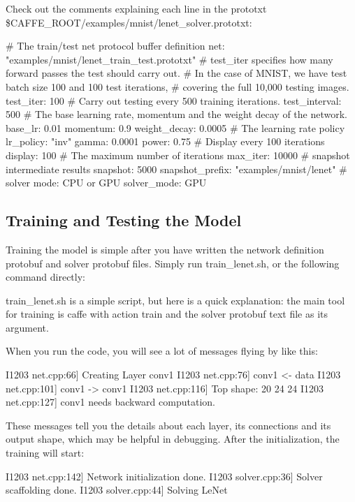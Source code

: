 Check out the comments explaining each line in the prototxt {\ttfamily \$\+C\+A\+F\+F\+E\+\_\+\+R\+O\+OT/examples/mnist/lenet\+\_\+solver.prototxt}\+: \begin{DoxyVerb}# The train/test net protocol buffer definition
net: "examples/mnist/lenet_train_test.prototxt"
# test_iter specifies how many forward passes the test should carry out.
# In the case of MNIST, we have test batch size 100 and 100 test iterations,
# covering the full 10,000 testing images.
test_iter: 100
# Carry out testing every 500 training iterations.
test_interval: 500
# The base learning rate, momentum and the weight decay of the network.
base_lr: 0.01
momentum: 0.9
weight_decay: 0.0005
# The learning rate policy
lr_policy: "inv"
gamma: 0.0001
power: 0.75
# Display every 100 iterations
display: 100
# The maximum number of iterations
max_iter: 10000
# snapshot intermediate results
snapshot: 5000
snapshot_prefix: "examples/mnist/lenet"
# solver mode: CPU or GPU
solver_mode: GPU
\end{DoxyVerb}


\subsection*{Training and Testing the Model}

Training the model is simple after you have written the network definition protobuf and solver protobuf files. Simply run {\ttfamily train\+\_\+lenet.\+sh}, or the following command directly\+: 


{\ttfamily train\+\_\+lenet.\+sh} is a simple script, but here is a quick explanation\+: the main tool for training is {\ttfamily caffe} with action {\ttfamily train} and the solver protobuf text file as its argument.

When you run the code, you will see a lot of messages flying by like this\+: \begin{DoxyVerb}I1203 net.cpp:66] Creating Layer conv1
I1203 net.cpp:76] conv1 <- data
I1203 net.cpp:101] conv1 -> conv1
I1203 net.cpp:116] Top shape: 20 24 24
I1203 net.cpp:127] conv1 needs backward computation.
\end{DoxyVerb}


These messages tell you the details about each layer, its connections and its output shape, which may be helpful in debugging. After the initialization, the training will start\+: \begin{DoxyVerb}I1203 net.cpp:142] Network initialization done.
I1203 solver.cpp:36] Solver scaffolding done.
I1203 solver.cpp:44] Solving LeNet
\end{DoxyVerb}


